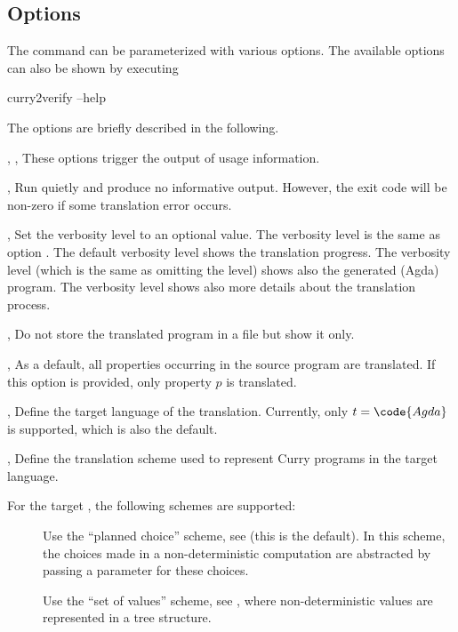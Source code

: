 \subsection{Options}

The command  can be parameterized
with various options.
The available options can also be shown by executing
\begin{curry}
curry2verify --help
\end{curry}
The options are briefly described in the following.

\begin{description}
\item{, , }
These options trigger the output of usage information.

\item{, }
Run quietly and produce no informative output.
However, the exit code will be non-zero if some translation error occurs.

\item{, }
Set the verbosity level to an optional value.
The verbosity level  is the same as option .
The default verbosity level  shows the translation progress.
The verbosity level  (which is the same as omitting the level)
shows also the generated (Agda) program.
The verbosity level  shows also more details about
the translation process.

\item{, }
Do not store the translated program in a file but show it only.

\item{, }
As a default, all properties occurring in the source program are
translated. If this option is provided, only property $p$ is translated.

\item{, }
Define the target language of the translation.
Currently, only $t = \code{Agda}$ is supported, which is also the
default.

\item{, }
Define the translation scheme used to represent Curry programs
in the target language.

For the target , the following schemes are supported:
\begin{description}
\item[]
Use the ``planned choice'' scheme, see \cite{AntoyHanusLibby16}
(this is the default).
In this scheme, the choices made in a non-deterministic computation
are abstracted by passing a parameter for these choices.
\item[]
Use the ``set of values'' scheme, see \cite{AntoyHanusLibby16},
where non-deterministic values are represented in a tree structure.
\end{description}

\end{description}

